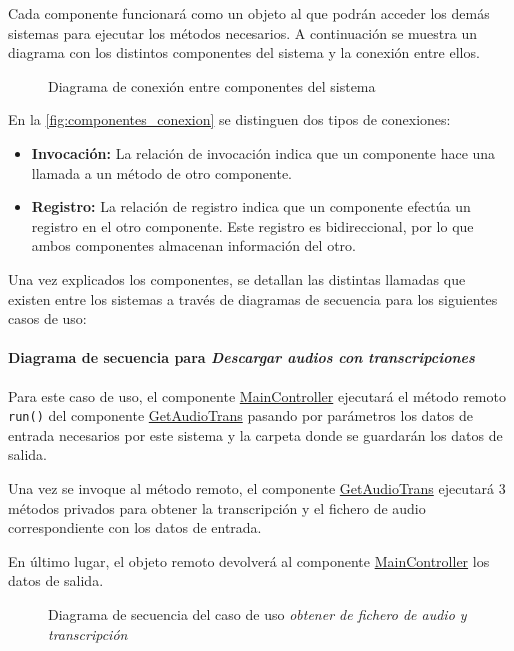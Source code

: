 \documentclass[../main.tex]{subfiles}
\begin{document}
Cada componente funcionará como un objeto al que podrán acceder los demás sistemas para ejecutar los métodos necesarios. A continuación se muestra un diagrama con los distintos componentes del sistema y la conexión entre ellos.

\begin{figure}[H]
    \centering
    
    \caption{Diagrama de conexión entre componentes del sistema}
    \label{fig:componentes_conexion}
\end{figure}

En la \autoref{fig:componentes_conexion} se distinguen dos tipos de conexiones:
\begin{itemize}
    \item \textbf{Invocación:} La relación de invocación indica que un componente hace una llamada a un método de otro componente.
    \item \textbf{Registro:} La relación de registro indica que un componente efectúa un registro en el otro componente. Este registro es bidireccional, por lo que ambos componentes almacenan información del otro.
\end{itemize}

Una vez explicados los componentes, se detallan las distintas llamadas que existen entre los sistemas a través de diagramas de secuencia para los siguientes casos de uso:

\paragraph{Diagrama de secuencia para \textit{Descargar audios con transcripciones}}

Para este caso de uso, el componente \hyperref[par:maincontroller]{MainController} ejecutará el método remoto \verb+run()+ del componente  \hyperref[par:getaudiotrans]{GetAudioTrans} pasando por parámetros los datos de entrada necesarios por este sistema y la carpeta donde se guardarán los datos de salida.

Una vez se invoque al método remoto, el componente \hyperref[par:getaudiotrans]{GetAudioTrans} ejecutará 3 métodos privados para obtener la transcripción y el fichero de audio correspondiente con los datos de entrada.

En último lugar, el objeto remoto devolverá al componente \hyperref[par:maincontroller]{MainController} los datos de salida.

\begin{figure}[H]
    \centering
    
    \caption{Diagrama de secuencia del caso de uso \textit{obtener de fichero de audio y transcripción}}
    \label{fig:flow_getaudiotrans}
\end{figure}
\end{document}

